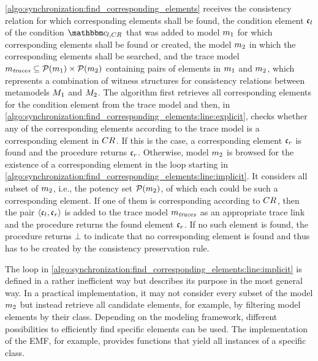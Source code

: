 \autoref{algo:synchronization:find_corresponding_elements} receives the consistency relation for which corresponding elements shall be found, the condition element $\conditionelement{c}{l}$ of the condition $\condition{c}{l,\consistencyrelation{CR}{}}$ that was added to model $\model{m}{1}$ for which corresponding elements shall be found or created, the model $\model{m}{2}$ in which the corresponding elements shall be searched, and the trace model $\model{m}{\mathvariable{traces}} \subseteq \mathcal{P}(\model{m}{1}) \times \mathcal{P}(\model{m}{2})$ containing pairs of elements in $\model{m}{1}$ and $\model{m}{2}$, which represents a combination of witness structures for consistency relations between metamodels $\metamodel{M}{1}$ and $\metamodel{M}{2}$. 
The algorithm first retrieves all corresponding elements for the condition element from the trace model and then, in \autoref{algo:synchronization:find_corresponding_elements:line:explicit}, checks whether any of the corresponding elements according to the trace model is a corresponding element in $\consistencyrelation{CR}{}$.
If this is the case, a corresponding element $\conditionelement{c}{r}$ is found and the procedure returns $\conditionelement{c}{r}$.
Otherwise, model $\model{m}{2}$ is browsed for the existence of a corresponding element in the loop starting in \autoref{algo:synchronization:find_corresponding_elements:line:implicit}.
It considers all subset of $\model{m}{2}$, i.e., the potency set $\mathcal{P}(\model{m}{2})$, of which each could be such a corresponding element.
If one of them is corresponding according to $\consistencyrelation{CR}{}$, then the pair $\tupled{\conditionelement{c}{l},\conditionelement{c}{r}}$ is added to the trace model $\model{m}{\mathvariable{traces}}$ as an appropriate trace link and the procedure returns the found element $\conditionelement{c}{r}$.
If no such element is found, the procedure returns $\bot$ to indicate that no corresponding element is found and thus has to be created by the consistency preservation rule.

The loop in \autoref{algo:synchronization:find_corresponding_elements:line:implicit} is defined in a rather inefficient way but describes its purpose in the most general way.
In a practical implementation, it may not consider every subset of the model $\model{m}{2}$ but instead retrieve all candidate elements, for example, by filtering model elements by their class.
Depending on the modeling framework, different possibilities to efficiently find specific elements can be used.
The implementation of the \gls{EMF}, for example, provides functions that yield all instances of a specific class.

